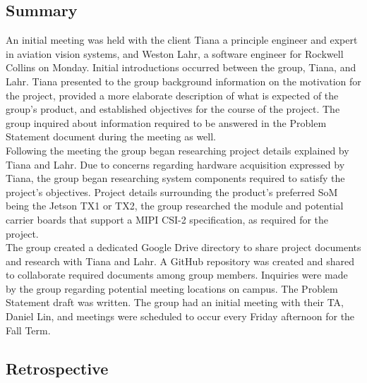\documentclass[letterpaper,10pt,serif,draftclsnofoot,onecolumn,compsoc,titlepage]{IEEEtran}
\begin{document}
\subsection{Summary}

An initial meeting was held with the client Tiana a principle engineer and expert 
in aviation vision systems, and Weston Lahr, a software engineer 
for Rockwell Collins on Monday. Initial introductions occurred between the group, 
Tiana, and Lahr. 
Tiana presented to the group background information on the motivation for the project, 
provided a more elaborate description of what is expected of the group's product, and 
established objectives for the course of the project. The group inquired about 
information required to be answered in the Problem Statement document during the meeting 
as well. \\

Following the meeting the group began researching project details explained by Tiana 
and Lahr. Due to concerns regarding hardware acquisition expressed by Tiana, the group 
began researching system components required to satisfy the project's objectives. 
Project details surrounding the product's preferred SoM being the Jetson TX1 or TX2, 
the group researched the module and potential carrier boards that support a MIPI 
CSI-2 specification, as required for the project. \\

The group created a dedicated Google Drive directory to share project documents and 
research with Tiana and Lahr. A GitHub repository was created and shared to 
collaborate required documents among group members. 
Inquiries were made by the group regarding potential meeting locations on campus.
The Problem Statement draft was 
written. The group had an initial meeting with their TA, Daniel Lin, and meetings 
were scheduled to occur every Friday afternoon for the Fall Term.\\

\subsection{Retrospective}
\end{document}

